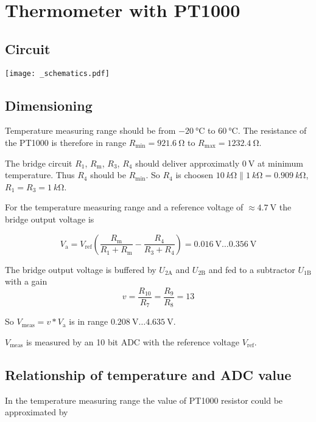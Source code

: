 \documentclass[fontsize=11pt, oneside]{scrartcl}
\newcommand{\F}[2]{{#1}_\mathrm{#2}}
\begin{document}
\section*{Thermometer with PT1000}

\subsection*{Circuit}
\texttt{[image: \_schematics.pdf]}

\subsection*{Dimensioning}

Temperature measuring range should be from $\qty{-20}{\degreeCelsius}$ to $\qty{+60}{\degreeCelsius}$.
The resistance of the PT1000 is therefore in range
$\F{R}{min} = \qty{921.6}{\ohm}$ to $\F{R}{max} = \qty{1232.4}{\ohm}$.

The bridge circuit $\F{R}{1}$, $\F{R}{m}$, $\F{R}{3}$, $\F{R}{4}$ should deliver approximatly $\qty{0}{\volt}$ at minimum
temperature. Thus $\F{R}{4}$ should be $\F{R}{min}$.
So $\F{R}{4}$ is choosen $\qty{10}{k\ohm} \parallel \qty{1}{k\ohm} = \qty{0.909}{k\ohm}$,
$\F{R}{1} = \F{R}{3} = \qty{1}{k\ohm}$.

For the temperature measuring range
and a reference voltage of $\approx\qty{4.7}{\volt}$
the bridge output voltage is

$$
\F{V}{a} = \F{V}{ref} \left( \frac{\F{R}{m}}{\F{R}{1} + \F{R}{m}} - \frac{\F{R}{4}}{\F{R}{3} + \F{R}{4}}\right) = \qty{0.016}{\volt} \ldots \qty{0.356}{\volt}
$$

The bridge output voltage is buffered by $\F{U}{2A}$ and $\F{U}{2B}$ and fed to a subtractor $\F{U}{1B}$
with a gain
$$
v = \frac{\F{R}{10}} {\F{R}{7}} = \frac{\F{R}{9}} {\F{R}{8}} = 13
$$

So $\F{V}{meas} = v * \F{V}{a}$ is in range $\qty{0.208}{\volt} \ldots \qty{4.635}{\volt}$.

$\F{V}{meas}$ is measured by an 10 bit ADC with the reference voltage $\F{V}{ref}$.


\subsection*{Relationship of temperature and ADC value}

In the temperature measuring range the value of PT1000 resistor could be approximated
\cite{la} by
\end{document}
